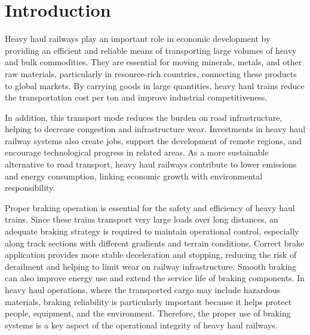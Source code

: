 \documentclass[preprint,10pt]{elsarticle}
\begin{document}
\section{Introduction}
\label{sec1}

Heavy haul railways play an important role in economic development by providing an efficient and reliable means of transporting large volumes of heavy and bulk commodities. They are essential for moving minerals, metals, and other raw materials, particularly in resource-rich countries, connecting these products to global markets. By carrying goods in large quantities, heavy haul trains reduce the transportation cost per ton and improve industrial competitiveness.

In addition, this transport mode reduces the burden on road infrastructure, helping to decrease congestion and infrastructure wear. Investments in heavy haul railway systems also create jobs, support the development of remote regions, and encourage technological progress in related areas. As a more sustainable alternative to road transport, heavy haul railways contribute to lower emissions and energy consumption, linking economic growth with environmental responsibility.

Proper braking operation is essential for the safety and efficiency of heavy haul trains. Since these trains transport very large loads over long distances, an adequate braking strategy is required to maintain operational control, especially along track sections with different gradients and terrain conditions. Correct brake application provides more stable deceleration and stopping, reducing the risk of derailment and helping to limit wear on railway infrastructure. Smooth braking can also improve energy use and extend the service life of braking components. In heavy haul operations, where the transported cargo may include hazardous materials, braking reliability is particularly important because it helps protect people, equipment, and the environment. Therefore, the proper use of braking systems is a key aspect of the operational integrity of heavy haul railways.
\end{document}
